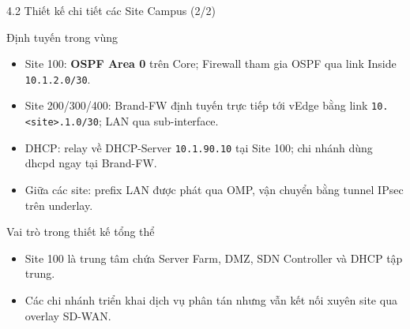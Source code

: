 \begin{frame}{4.2 Thiết kế chi tiết các Site Campus (2/2)}
    \small
    \begin{block}{Định tuyến trong vùng}
        \begin{itemize}
            \item Site 100: \textbf{OSPF Area 0} trên Core; Firewall tham
                  gia OSPF qua link Inside \texttt{10.1.2.0/30}.
            \item Site 200/300/400: Brand-FW định tuyến trực tiếp tới
                  vEdge bằng link \texttt{10.<site>.1.0/30}; LAN qua
                  sub-interface.
            \item DHCP: relay về DHCP-Server \texttt{10.1.90.10} tại
                  Site 100; chi nhánh dùng dhcpd ngay tại Brand-FW.
            \item Giữa các site: prefix LAN được phát qua OMP, vận chuyển
                  bằng tunnel IPsec trên underlay.
        \end{itemize}
    \end{block}
    \vspace{0.12cm}
    \begin{block}{Vai trò trong thiết kế tổng thể}
        \begin{itemize}
            \item Site 100 là trung tâm chứa Server Farm, DMZ, SDN
                  Controller và DHCP tập trung.
            \item Các chi nhánh triển khai dịch vụ phân tán nhưng vẫn
                  kết nối xuyên site qua overlay SD-WAN.
        \end{itemize}
    \end{block}
\end{frame}

